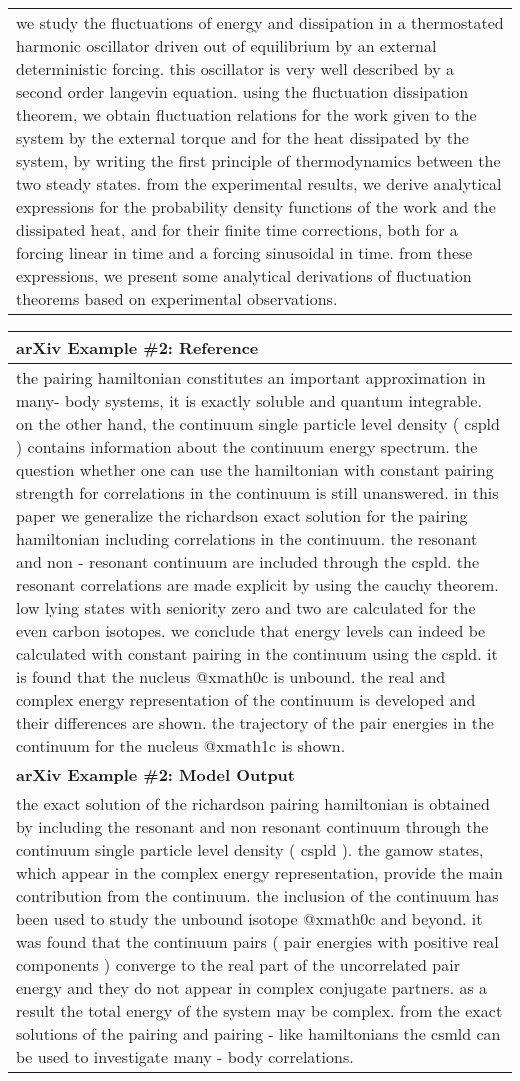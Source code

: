\begin{table}[!htbp]
\begin{tabular}{p{\linewidth}}
we study the fluctuations of energy and dissipation in a thermostated harmonic oscillator driven out of equilibrium by an external deterministic forcing. this oscillator is very well described by a second order langevin equation. using the fluctuation dissipation theorem, we obtain fluctuation relations for the work given to the system by the external torque and for the heat dissipated by the system, by writing the first principle of thermodynamics between the two steady states. from the experimental results, we derive analytical expressions for the probability density functions of the work and the dissipated heat, and for their finite time corrections, both for a forcing linear in time and a forcing sinusoidal in time. from these expressions, we present some analytical derivations of fluctuation theorems based on experimental observations.
    \\
    \end{tabular}
    \begin{tabular}{p{\linewidth}} 
    \midrule
    \textbf{arXiv Example \#2: Reference} \\
    \midrule
the pairing hamiltonian constitutes an important approximation in many- body systems, it is exactly soluble and quantum integrable. on the other hand, the continuum single particle level density ( cspld ) contains information about the continuum energy spectrum. the question whether one can use the hamiltonian with constant pairing strength for correlations in the continuum is still unanswered. in this paper we generalize the richardson exact solution for the pairing hamiltonian including correlations in the continuum. the resonant and non - resonant continuum are included through the cspld. the resonant correlations are made explicit by using the cauchy theorem. low lying states with seniority zero and two are calculated for the even carbon isotopes. we conclude that energy levels can indeed be calculated with constant pairing in the continuum using the cspld. it is found that the nucleus @xmath0c is unbound. the real and complex energy representation of the continuum is developed and their differences are shown. the trajectory of the pair energies in the continuum for the nucleus @xmath1c is shown.
    \\
    \midrule
    \textbf{arXiv Example \#2: Model Output} \\
    \midrule
the exact solution of the richardson pairing hamiltonian is obtained by including the resonant and non resonant continuum through the continuum single particle level density ( cspld ). the gamow states, which appear in the complex energy representation, provide the main contribution from the continuum. the inclusion of the continuum has been used to study the unbound isotope @xmath0c and beyond. it was found that the continuum pairs ( pair energies with positive real components ) converge to the real part of the uncorrelated pair energy and they do not appear in complex conjugate partners. as a result the total energy of the system may be complex. from the exact solutions of the pairing and pairing - like hamiltonians the csmld can be used to investigate many - body correlations.

\end{tabular}
\end{table}
